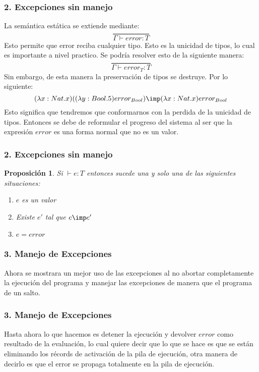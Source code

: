 \documentclass[xcolor=dvipsnames,table,spanish]{beamer}
\newtheorem{prop}{Proposición}
\begin{document}
\begin{frame}
\frametitle{2. Excepciones sin manejo}
	La semántica estática se extiende mediante:
	\begin{equation*}
         \frac{}{\Gamma \vdash error : T}
	\end{equation*}
    Esto permite que error reciba cualquier tipo. Esto es la unicidad de tipos, lo cual es importante a nivel practico. Se podría resolver esto de la siguiente manera:
    \begin{equation*}
         \frac{}{\Gamma \vdash error_T: T}
	\end{equation*}
    Sin embargo, de esta manera la preservación de tipos se destruye. Por lo siguiente:
    \begin{equation*}
         (\lambda x: Nat.x)((\lambda y:Bool.5)error_{Bool})\imp(\lambda x: Nat.x) error_{Bool}
	\end{equation*}
   Esto significa que tendremos que conformarnos con la perdida de la unicidad de tipos. Entonces se debe de reformular el progreso del sistema al ser que la expresión $error$ es una forma normal que no es un valor.

\end{frame}

\begin{frame}
\frametitle{2. Excepciones sin manejo}
\begin{prop}
Si $\vdash e:T$ entonces sucede una y solo una de las siguientes situaciones:
\begin{enumerate}
\item $e$ es un valor
\item Existe $e'$ tal que $e \imp e'$
\item $e = error$
\end{enumerate}
\end{prop}
\end{frame}

\begin{frame}
\frametitle{3. Manejo de Excepciones}
Ahora se mostrara un mejor uso de las excepciones al no abortar completamente la ejecución del programa y manejar las excepciones de manera que el programa de un salto.

\end{frame}

\begin{frame}
\frametitle{3. Manejo de Excepciones}
Hasta ahora lo que hacemos es detener la ejecución y devolver $error$ como resultado de la evaluación, lo cual quiere decir que lo que se hace es que se están eliminando los récords de activación de la pila de ejecución, otra manera de decirlo es que el error se propaga totalmente en la pila de ejecución.
\end{frame}
\end{document}
